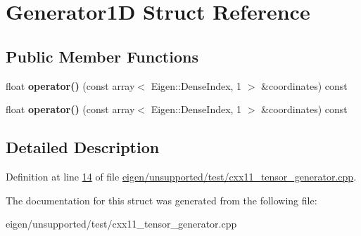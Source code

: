 \hypertarget{struct_generator1_d}{}\section{Generator1D Struct Reference}
\label{struct_generator1_d}
\subsection*{Public Member Functions}
\begin{DoxyCompactItemize}
\item 
\mbox{\label{struct_generator1_d_ae836497c9d5256719fac5d7bca9a32e4}} 
float {\bfseries operator()} (const array$<$ Eigen\+::\+Dense\+Index, 1 $>$ \&coordinates) const
\item 
\mbox{\label{struct_generator1_d_ae836497c9d5256719fac5d7bca9a32e4}} 
float {\bfseries operator()} (const array$<$ Eigen\+::\+Dense\+Index, 1 $>$ \&coordinates) const
\end{DoxyCompactItemize}


\subsection{Detailed Description}


Definition at line \hyperlink{eigen_2unsupported_2test_2cxx11__tensor__generator_8cpp_source_l00014}{14} of file \hyperlink{eigen_2unsupported_2test_2cxx11__tensor__generator_8cpp_source}{eigen/unsupported/test/cxx11\+\_\+tensor\+\_\+generator.\+cpp}.



The documentation for this struct was generated from the following file\+:\begin{DoxyCompactItemize}
\item 
eigen/unsupported/test/cxx11\+\_\+tensor\+\_\+generator.\+cpp\end{DoxyCompactItemize}
